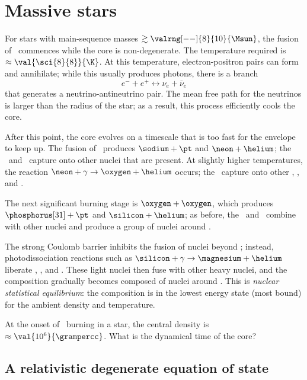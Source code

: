 \section{Massive stars}

For stars with main-sequence masses $\gtrsim \valrng[--]{8}{10}{\Msun}$, the fusion of \carbon\ commences while the core is non-degenerate.  The temperature required is $\approx\val{\sci{8}{8}}{\K}$.  At this temperature, electron-positron pairs can form and annihilate; while this usually produces photons, there is a branch
\[ e^{-}+e^{+} \longleftrightarrow \nu_{e} + \bar{\nu}_{e}\]
that generates a neutrino-antineutrino pair. The mean free path for the neutrinos is larger than the radius of the star; as a result, this process efficiently cools the core.

After this point, the core evolves on a timescale that is too fast for the envelope to keep up.  The fusion of \carbon\ produces $\sodium+\pt$ and $\neon+\helium$; the \pt\ and \helium\ capture onto other nuclei that are present.  At slightly higher temperatures, the reaction $\neon+\gamma \to \oxygen+\helium$ occurs; the \helium\ capture onto other \oxygen, \neon, and \magnesium.

The next significant burning stage is $\oxygen+\oxygen$, which produces $\phosphorus[31]+\pt$ and $\silicon+\helium$; as before, the \pt\ and \helium\ combine with other nuclei and produce a group of nuclei around \silicon.

The strong Coulomb barrier inhibits the fusion of nuclei beyond \oxygen; instead, photodissociation reactions such as $\silicon+\gamma \to \magnesium+\helium$ liberate \nt, \pt, and \helium.  These light nuclei then fuse with other heavy nuclei, and the composition gradually becomes composed of nuclei around \iron.  This is \emph{nuclear statistical equilibrium}: the composition is in the lowest energy state (most bound) for the ambient density and temperature.

\begin{exercisebox}
At the onset of \oxygen\ burning in a  star, the central density is $\approx \val{10^{6}}{\grampercc}$.  What is the dynamical time of the core?
\end{exercisebox}

\subsection{A relativistic degenerate equation of state}

